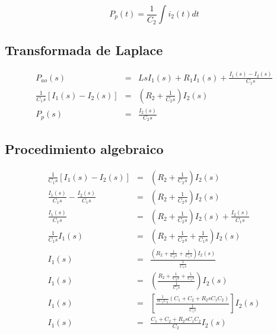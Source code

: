 \documentclass[letterpaper,11pt]{article}
\begin{document}
\bigskip

\begin{equation*}
P_{p}\left( t\right) =\frac{1}{C_{2}}\int i_{2}\left( t\right) dt
\end{equation*}

\subsection{Transformada de Laplace}

\bigskip 
\begin{eqnarray*}
P_{ao}\left( s\right) &=&LsI_{1}\left( s\right) +R_{1}I_{1}\left( s\right) +%
\frac{I_{1}\left( s\right) -I_{2}\left( s\right) }{C_{1}s} \\
\frac{1}{C_{1}s}\left[ I_{1}\left( s\right) -I_{2}\left( s\right) \right]
&=&\left( R_{2}+\frac{1}{C_{2}s}\right) I_{2}\left( s\right) \\
P_{p}\left( s\right) &=&\frac{I_{2}\left( s\right) }{C_{2}s}
\end{eqnarray*}

\subsection{Procedimiento algebraico}

\begin{eqnarray*}
\frac{1}{C_{1}s}\left[ I_{1}\left( s\right) -I_{2}\left( s\right) \right]
&=&\left( R_{2}+\frac{1}{C_{2}s}\right) I_{2}\left( s\right) \\
\frac{I_{1}\left( s\right) }{C_{1}s}-\frac{I_{2}\left( s\right) }{C_{1}s}
&=&\left( R_{2}+\frac{1}{C_{2}s}\right) I_{2}\left( s\right) \\
\frac{I_{1}\left( s\right) }{C_{1}s} &=&\left( R_{2}+\frac{1}{C_{2}s}\right)
I_{2}\left( s\right) +\frac{I_{2}\left( s\right) }{C_{1}s} \\
\frac{1}{C_{1}s}I_{1}\left( s\right) &=&\left( R_{2}+\frac{1}{C_{2}s}+\frac{1%
}{C_{1}s}\right) I_{2}\left( s\right) \\
I_{1}\left( s\right) &=&\frac{\left( R_{2}+\frac{1}{C_{2}s}+\frac{1}{C_{1}s}%
\right) I_{2}\left( s\right) }{\frac{1}{C_{1}s}} \\
I_{1}\left( s\right) &=&\left( \frac{R_{2}+\frac{1}{C_{2}s}+\frac{1}{C_{1}s}%
}{\frac{1}{C_{1}s}}\right) I_{2}\left( s\right) \\
I_{1}\left( s\right) &=&\left[ \frac{\frac{1}{sC_{1}C_{2}}\left(
C_{1}+C_{2}+R_{2}sC_{1}C_{2}\right) }{\frac{1}{C_{1}s}}\right] I_{2}\left(
s\right) \\
I_{1}\left( s\right) &=&\frac{C_{1}+C_{2}+R_{2}sC_{1}C_{2}}{C_{2}}%
I_{2}\left( s\right)
\end{eqnarray*}
\end{document}
